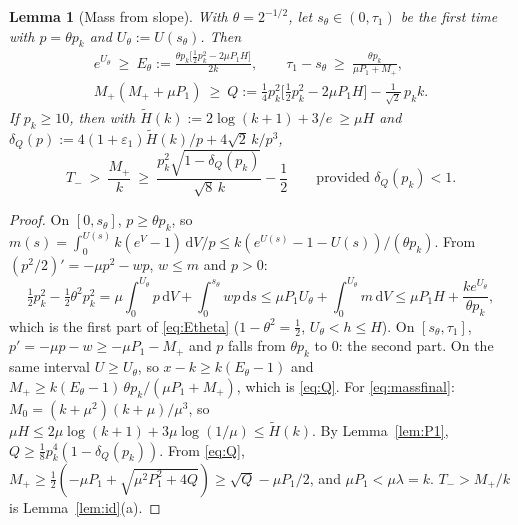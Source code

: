 \documentclass[11pt,a4paper]{article}
\newtheorem{lemma}[theorem]{Lemma}
\theoremstyle{remark}\newtheorem{remark}[theorem]{Remark}
\newcommand{\dd}{\,\mathrm d}
\begin{document}
\begin{lemma}[Mass from slope]\label{lem:mass}
With $\theta=2^{-1/2}$, let $s_\theta\in(0,\tau_1)$ be the first time with $p=\theta p_k$ and
$U_\theta:=U(s_\theta)$. Then
\begin{gather}
e^{U_\theta}\ \ge\ E_\theta:=\frac{\theta p_k\bigl[\tfrac12p_k^2-2\mu P_1H\bigr]}{2k},\qquad
\tau_1-s_\theta\ \ge\ \frac{\theta p_k}{\mu P_1+M_+},\label{eq:Etheta}\\
M_+(M_++\mu P_1)\ \ge\ Q:=\tfrac14p_k^2\bigl[\tfrac12p_k^2-2\mu P_1H\bigr]-\tfrac{1}{\sqrt2}\,p_kk .\label{eq:Q}
\end{gather}
If $p_k\ge10$, then with $\tilde H(k):=2\log(k+1)+3/e\ \ge\mu H$ and
$\delta_Q(p):=4(1+\varepsilon_1)\tilde H(k)/p+4\sqrt2\,k/p^3$,
\begin{equation}\label{eq:massfinal}
T_-\ >\ \frac{M_+}{k}\ \ge\ \frac{p_k^2\sqrt{1-\delta_Q(p_k)}}{\sqrt8\,k}-\frac12
\qquad\text{provided }\delta_Q(p_k)<1 .
\end{equation}
\end{lemma}
\begin{proof}
On $[0,s_\theta]$, $p\ge\theta p_k$, so $m(s)=\int_0^{U(s)}k(e^V-1)\dd V/p\le k(e^{U(s)}-1-U(s))/(\theta p_k)$.
From $(p^2/2)'=-\mu p^2-wp$, $w\le m$ and $p>0$:
\[
\tfrac12p_k^2-\tfrac12\theta^2p_k^2=\mu\!\int_0^{U_\theta}\!p\dd V+\!\int_0^{s_\theta}\!wp\dd s
\le\mu P_1U_\theta+\!\int_0^{U_\theta}\!m\dd V\le\mu P_1H+\frac{ke^{U_\theta}}{\theta p_k},
\]
which is the first part of \eqref{eq:Etheta} ($1-\theta^2=\tfrac12$, $U_\theta<h\le H$). On $[s_\theta,\tau_1]$,
$p'=-\mu p-w\ge-\mu P_1-M_+$ and $p$ falls from $\theta p_k$ to $0$: the second part. On the same
interval $U\ge U_\theta$, so $x-k\ge k(E_\theta-1)$ and
$M_+\ge k(E_\theta-1)\,\theta p_k/(\mu P_1+M_+)$, which is \eqref{eq:Q}.
For \eqref{eq:massfinal}: $M_0=(k+\mu^2)(k+\mu)/\mu^3$, so
$\mu H\le2\mu\log(k+1)+3\mu\log(1/\mu)\le\tilde H(k)$. By Lemma~\ref{lem:P1},
$Q\ge\tfrac18p_k^4(1-\delta_Q(p_k))$. From \eqref{eq:Q},
$M_+\ge\tfrac12(-\mu P_1+\sqrt{\mu^2P_1^2+4Q})\ge\sqrt Q-\mu P_1/2$, and $\mu P_1<\mu\lambda=k$.
$T_->M_+/k$ is Lemma~\ref{lem:id}(a).
\end{proof}
\end{document}
